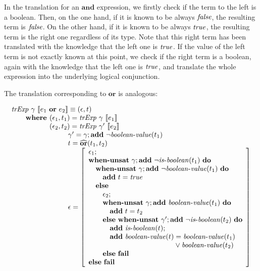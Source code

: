 In the translation for an $\mathbf{and}$ expression, we firstly check if 
the term to the left is a boolean. Then, on the one hand, if it is known to be always 
$\mathit{false}$, the resulting term is $\mathit{false}$. On the other hand, if it 
is known to be always $\mathit{true}$, the resulting term is the right one 
regardless of its type. Note that this right term has been translated with the 
knowledge that the left one is $\mathit{true}$. If the value of the 
left term is not exactly known at this point, we check if the right term 
is a boolean, again with the knowledge that the left one is $\mathit{true}$,
and translate the whole expression into the underlying logical conjunction.

The translation corresponding to $\mathbf{or}$ is analogous:

\[
\begin{array}{l}
\trExp{\gamma}{\orE{e_1}{e_2}} \equiv (\epsilon, t)\\
\qquad \textbf{where }(\epsilon_1, t_1) = \trExp{\gamma}{e_1}\\
\qquad \phantom{\textbf{where }}(\epsilon_2, t_2) = \trExp{\gamma'}{e_2}\\
\qquad\qquad\qquad\qquad \gamma' = \gamma;\addE~\neg\booleanvalue{t_1}\\
\qquad\qquad\qquad\qquad t = \widehat{\mathbf{or}}(t_1, t_2)\\
\qquad\qquad\qquad\qquad \epsilon = \left[ 
\begin{array}{l}
\epsilon_1;\\
\whenUnsatW~\gamma;\addE~\neg\isboolean{t_1}~\doW\\
\quad\whenUnsatW~\gamma;\addE~\neg\booleanvalue{t_1}~\doW\\
\quad\quad\addE~t = \true\\
\quad\elseW\\
\quad\quad\epsilon_2;\\
\quad\quad\whenUnsatW~\gamma;\addE~\booleanvalue{t_1}~\doW\\
\quad\quad\quad\addE~t = t_2\\
\quad\quad\elseW~\whenUnsatW~\gamma';\addE~\neg\isboolean{t_2}~\doW\\
\quad\quad\quad\addE~\isboolean{t};\\
\quad\quad\quad\addE~\booleanvalue{t} = \booleanvalue{t_1} \\
\quad\phantom{\quad\quad\addE~\booleanvalue{t}} \lor \booleanvalue{t_2}\\
\quad\quad\elseW~\failE\\
\elseW~\failE
\end{array}
\right] \\
\end{array}
\]

